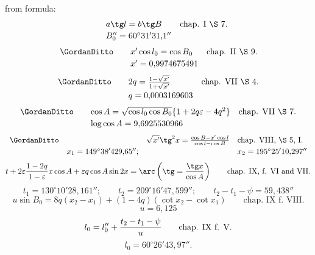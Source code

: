 \begingroup\small
from formula:
\[
\begin{array}{rcll}
&& a\tg l=b\tg B&\text{chap. I \S\ 7.}\vspace{0.2em}\\
&& B_0''=60^\circ31'31{,}1''&
\end{array}
\]
\[
\begin{array}{rcll}
\GordanDitto&& x'\cos l_0=\cos B_0&\text{chap. II \S\ 9.}\vspace{0.2em}\\
&& x'=0{,}9974675491&
\end{array}
\]
\[
\begin{array}{rcll}
\GordanDitto&&2q={1-\sqrt{x'}\over1+\sqrt{x'}}&\text{chap. VII \S\ 4.}\vspace{0.2em}\\
&&q=0{,}0003169603&
\end{array}
\]
\[
\begin{array}{rcll}
\GordanDitto&&\cos A=\sqrt{\cos l_0\cos B_0}\{1+2q\varepsilon-4q^2\}&\text{chap. VII \S\ 7.}\vspace{0.2em}\\
&&\log\cos A=9{,}6925530966&
\end{array}
\]
\[
\begin{array}{rcll}
\GordanDitto&&\sqrt{x'}\tg^2x={\cos B-x'\cos l\over\cos l-\cos B}&\text{chap. VIII, \S\ 5, I.}\vspace{0.2em}\\
&x_1=149^\circ38'429{,}65'';&&x_2=195^\circ25'10{,}297''
\end{array}
\]
\[
 t+2\varepsilon{1-2q\over1-\varepsilon}x\cos A+\varepsilon q\cos A\sin2x
 =\arc\left(\tg={\tg x\over\cos A}\right)
 \qquad\text{chap. IX, f. VI and VII.}
\]
\[
 t_1=130^\circ10'28{,}161'';\qquad t_2=209^\circ16'47{,}599'';\qquad t_2-t_1-\psi=59{,}438''
\]
\[
 u\sin B_0=8q(x_2-x_1)+(1-4q)(\cot x_2-\cot x_1)
 \qquad\text{chap. IX f. VIII.}
\]
\[
 u=6{,}125
\]
\[
 l_0=l_0''+{t_2-t_1-\psi\over u}
 \qquad\text{chap. IX f. V.}
\]
\[
 l_0=60^\circ26'43{,}97''.
\]

\GordanOrnament
\endgroup
